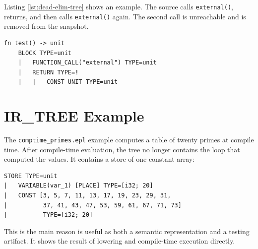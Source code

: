 Listing \ref{lst:dead-elim-tree} shows an example. The source calls
\texttt{external()}, returns, and then calls \texttt{external()} again. The
second call is unreachable and is removed from the \irtree{} snapshot.

\begin{lstlisting}[caption={IR\_TREE after dead-code cleanup},label={lst:dead-elim-tree}]
fn test() -> unit
    BLOCK TYPE=unit
    |   FUNCTION_CALL("external") TYPE=unit
    |   RETURN TYPE=!
    |   |   CONST UNIT TYPE=unit
\end{lstlisting}

\section{IR\_TREE Example}

The \texttt{comptime\_primes.epl} example computes a table of twenty primes at
compile time. After compile-time evaluation, the tree no longer contains the
loop that computed the values. It contains a store of one constant array:

\begin{lstlisting}[caption={Compile-time result in IR\_TREE}]
STORE TYPE=unit
|   VARIABLE(var_1) [PLACE] TYPE=[i32; 20]
|   CONST [3, 5, 7, 11, 13, 17, 19, 23, 29, 31,
|          37, 41, 43, 47, 53, 59, 61, 67, 71, 73]
|          TYPE=[i32; 20]
\end{lstlisting}

This is the main reason \irtree{} is useful as both a semantic representation
and a testing artifact. It shows the result of lowering and compile-time
execution directly.
